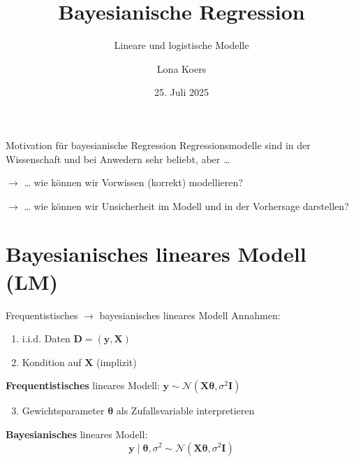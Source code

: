 \documentclass[
  ignorenonframetext,
  aspectratio=169,
]{beamer}
\title{Bayesianische Regression}
\subtitle{Lineare und logistische Modelle}
\author{Lona Koers}
\date{25. Juli 2025}
\institute{LMU}
\providecommand{\tightlist}{%
  \setlength{\itemsep}{0pt}\setlength{\parskip}{0pt}}
\newcommand{\by}{\bm{y}}
\newcommand{\bD}{\bm{D}}
\newcommand{\bI}{\bm{I}}
\newcommand{\bX}{\bm{X}}
\newcommand{\Ncal}{\mathcal{N}}
\newcommand{\ssd}{\sigma^2}
\newcommand{\btheta}{\bm{\theta}}
\begin{document}
\frame{\titlepage}

\begin{frame}{Motivation für bayesianische Regression}
\protect{}\label{motivation-fuxfcr-bayesianische-regression}
Regressionsmodelle sind in der Wissenschaft und bei Anwedern sehr
beliebt, aber \ldots{}

\vspace{0.5cm}

\(\to\) \ldots{} wie können wir Vorwissen (korrekt) modellieren?

\(\to\) \ldots{} wie können wir Unsicherheit im Modell und in der
Vorhersage darstellen?
\end{frame}

\section{\texorpdfstring{Bayesianisches \textbf{lineares} Modell
(LM)}{Bayesianisches lineares Modell (LM)}}\label{bayesianisches-lineares-modell-lm}

\begin{frame}{Frequentistisches \(\to\) bayesianisches lineares Modell}
\protect{}\label{frequentistisches-to-bayesianisches-lineares-modell}
Annahmen:

\begin{enumerate}
\tightlist
\item
  i.i.d. Daten \(\bD = (\by, \bX)\)
\item
  Kondition auf \(\bX\) (implizit)
\end{enumerate}

\textbf{Frequentistisches} lineares Modell:
\(\by \sim \Ncal(\bX \btheta, \ssd \bI)\)

\begin{enumerate}
\setcounter{enumi}{2}
\tightlist
\item
  Gewichtsparameter \(\btheta\) als Zufallsvariable interpretieren
\end{enumerate}

\vspace{0.5cm}

\begin{block}{\textbf{Bayesianisches} lineares Modell:}
\protect{}\label{bayesianisches-lineares-modell}
\[\by \mid \btheta, \ssd \sim \Ncal(\bX \btheta, \ssd \bI)\]
\end{block}
\end{frame}
\end{document}
